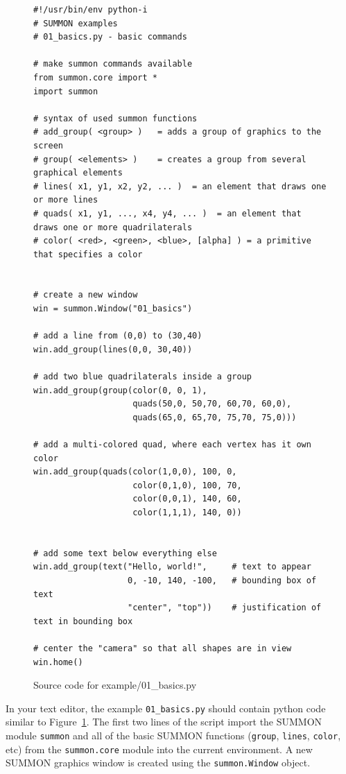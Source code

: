 \documentclass[12pt]{article}
\newcommand{\code}[1]{{\tt #1}}
\newcommand{\figref}[1]{Figure~\ref{#1}}
\begin{document}
\begin{figure}
\begin{center}
\begin{minipage}{6in}
{ \footnotesize
\begin{verbatim}
#!/usr/bin/env python-i
# SUMMON examples
# 01_basics.py - basic commands

# make summon commands available
from summon.core import *
import summon

# syntax of used summon functions
# add_group( <group> )   = adds a group of graphics to the screen
# group( <elements> )    = creates a group from several graphical elements
# lines( x1, y1, x2, y2, ... )  = an element that draws one or more lines
# quads( x1, y1, ..., x4, y4, ... )  = an element that draws one or more quadrilaterals
# color( <red>, <green>, <blue>, [alpha] ) = a primitive that specifies a color


# create a new window
win = summon.Window("01_basics")

# add a line from (0,0) to (30,40)
win.add_group(lines(0,0, 30,40))

# add two blue quadrilaterals inside a group
win.add_group(group(color(0, 0, 1), 
                    quads(50,0, 50,70, 60,70, 60,0),
                    quads(65,0, 65,70, 75,70, 75,0)))

# add a multi-colored quad, where each vertex has it own color
win.add_group(quads(color(1,0,0), 100, 0,
                    color(0,1,0), 100, 70,
                    color(0,0,1), 140, 60,
                    color(1,1,1), 140, 0))


# add some text below everything else
win.add_group(text("Hello, world!",     # text to appear
                   0, -10, 140, -100,   # bounding box of text
                   "center", "top"))    # justification of text in bounding box

# center the "camera" so that all shapes are in view
win.home()

\end{verbatim}
}
\end{minipage}
\end{center}
\caption{Source code for example/01\_basics.py}
\label{fig:01_basics_code}
\end{figure}

In your text editor, the example \code{01\_basics.py} should contain 
python code similar to \figref{fig:01_basics_code}.
The first two lines of the script import the SUMMON module \code{summon} and
all of  the basic SUMMON functions (\code{group}, \code{lines}, \code{color},
etc) from the \code{summon.core} module into the current environment.   A new
SUMMON graphics window is created using the \code{summon.Window} object.
\end{document}
